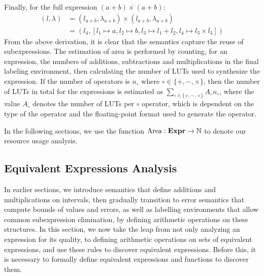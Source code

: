 Finally, for the full expression $(a + b) \times (a + b)$:
\begin{equation}
    \begin{aligned}
        (l, \lambda)
            &= (l_{a + b}, \lambda_{a + b}) \times
               (l_{a + b}, \lambda_{a + b}) \\
            &= (l_4, [l_1\mapsto{a}, l_2\mapsto{b},
                      l_3\mapsto{l_1 + l_2}, l_4\mapsto{l_3 \times l_3}])
    \end{aligned}
\end{equation}
From the above derivation, it is clear that the semantics capture the reuse
of subexpressions. The estimation of area is performed by counting, for an
expression, the numbers of additions, subtractions and multiplications in
the final labeling environment, then calculating the number of LUTs used to
synthesize the expression. If the number of operators is $n_\circ$ where
$\circ\in\{+,-,\times\}$, then the number of LUTs in total for the expressions
is estimated as $\sum_{\circ\in\{+,-,\times\}} A_\circ n_\circ$, where the
value $A_\circ$ denotes the number of LUTs per $\circ$ operator, which is
dependent on the type of the operator and the floating-point format used to
generate the operator.

In the following sections, we use the function $\operatorname{\mathrm{Area}}: \mathbf{Expr}\to\mathbb{N}$
to denote our resource usage analysis.

\subsection{Equivalent Expressions Analysis}
\label{so:sub:equivalent_expressions_analysis}

In earlier sections, we introduce semantics that define additions and
multiplications on intervals, then gradually transition to error semantics that
compute bounds of values and errors, as well as labelling environments that
allow common subexpression elimination, by defining arithmetic operations on
these structures. In this section, we now take the leap from not only analyzing
an expression for its quality, to defining arithmetic operations on sets of
equivalent expressions, and use these rules to discover equivalent expressions.
Before this, it is necessary to formally define equivalent expressions and
functions to discover them.

